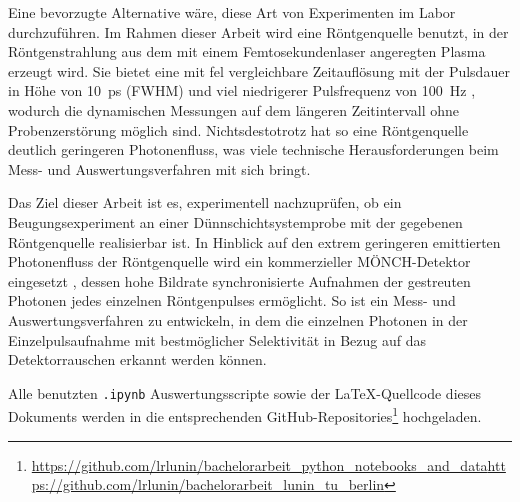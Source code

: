 \noindent
Eine bevorzugte Alternative wäre, diese Art von Experimenten im Labor durchzuführen. Im Rahmen dieser Arbeit wird eine Röntgenquelle benutzt, in der Röntgenstrahlung aus dem mit einem Femtosekundenlaser angeregten Plasma erzeugt wird. Sie bietet eine mit \gls{fel} vergleichbare Zeitauflösung mit der Pulsdauer in Höhe von \SI{10}{\pico\second} (FWHM) und viel niedrigerer Pulsfrequenz von \SI{100}{\hertz} \cite{schick_laser-driven_2021}, wodurch die dynamischen Messungen auf dem längeren Zeitintervall ohne Probenzerstörung möglich sind. Nichtsdestotrotz hat so eine Röntgenquelle deutlich geringeren Photonenfluss, was viele technische Herausforderungen beim Mess- und Auswertungsverfahren mit sich bringt.

\noindent
Das Ziel dieser Arbeit ist es, experimentell nachzuprüfen, ob ein Beugungsexperiment an einer Dünnschichtsystemprobe mit der gegebenen Röntgenquelle realisierbar ist. In Hinblick auf den extrem geringeren emittierten Photonenfluss der Röntgenquelle wird ein kommerzieller MÖNCH-Detektor eingesetzt \cite{ramilli-measurements-2017}, dessen hohe Bildrate synchronisierte Aufnahmen der gestreuten Photonen jedes einzelnen Röntgenpulses ermöglicht. So ist ein Mess- und Auswertungsverfahren zu entwickeln, in dem die einzelnen Photonen in der Einzelpulsaufnahme mit bestmöglicher Selektivität in Bezug auf das Detektorrauschen erkannt werden können.

\noindent
Alle benutzten \texttt{.ipynb} Auswertungsscripte sowie der \LaTeX-Quellcode dieses Dokuments werden in die entsprechenden GitHub-Repositories\footnote{\url{https://github.com/lrlunin/bachelorarbeit_python_notebooks_and_data}\newline\url{https://github.com/lrlunin/bachelorarbeit_lunin_tu_berlin}} hochgeladen.   

